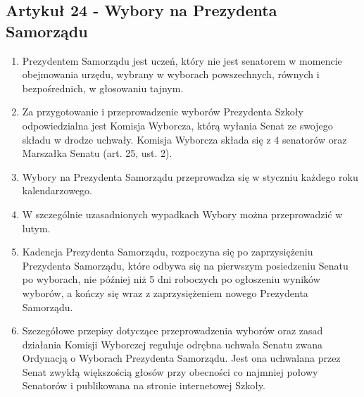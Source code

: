 \documentclass[14pt]{article}
\newenvironment{ustepy}{%
	\begin{enumerate}[leftmargin=1.5em, itemindent=1pt, labelwidth=1em, itemsep=5pt]
	}{%
	\end{enumerate}
}
\begin{document}
\subsection*{Artykuł 24 - Wybory na Prezydenta Samorządu}
\begin{ustepy}
	\item Prezydentem Samorządu jest uczeń, który nie jest senatorem w momencie obejmowania urzędu, wybrany w wyborach powszechnych, równych i bezpośrednich, w głosowaniu tajnym.
	\item Za przygotowanie i przeprowadzenie wyborów Prezydenta Szkoły odpowiedzialna jest Komisja Wyborcza, którą wyłania Senat ze swojego składu w drodze uchwały. Komisja Wyborcza składa się z 4 senatorów oraz Marszałka Senatu (art. 25, ust. 2).
	\item Wybory na Prezydenta Samorządu przeprowadza się w styczniu każdego roku kalendarzowego.
	\item W szczególnie uzasadnionych wypadkach Wybory można przeprowadzić w lutym.
	\item Kadencja Prezydenta Samorządu, rozpoczyna się po zaprzysiężeniu Prezydenta Samorządu, które odbywa się na pierwszym posiedzeniu Senatu po wyborach, nie później niż 5 dni roboczych po ogłoszeniu wyników wyborów, a kończy się wraz z zaprzysiężeniem nowego Prezydenta Samorządu.
	\item Szczegółowe przepisy dotyczące przeprowadzenia wyborów oraz zasad działania Komisji Wyborczej reguluje odrębna uchwała Senatu zwana Ordynacją o Wyborach Prezydenta Samorządu. Jest ona uchwalana przez Senat zwykłą większością głosów przy obecności co najmniej połowy Senatorów i publikowana na stronie internetowej Szkoły.
\end{ustepy}
\newpage
\end{document}

